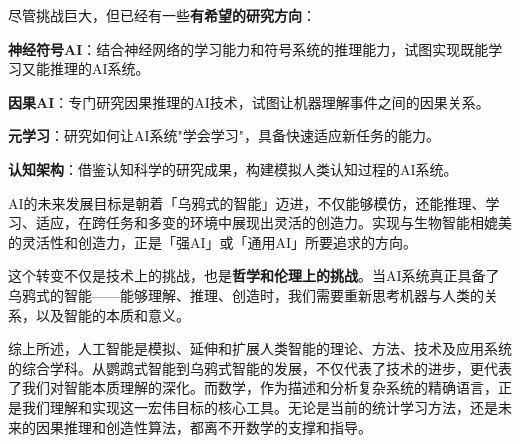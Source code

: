 尽管挑战巨大，但已经有一些{\bf 有希望的研究方向}：

{\bf 神经符号AI}：结合神经网络的学习能力和符号系统的推理能力，试图实现既能学习又能推理的AI系统。

{\bf 因果AI}：专门研究因果推理的AI技术，试图让机器理解事件之间的因果关系。

{\bf 元学习}：研究如何让AI系统"学会学习"，具备快速适应新任务的能力。

{\bf 认知架构}：借鉴认知科学的研究成果，构建模拟人类认知过程的AI系统。

AI的未来发展目标是朝着「乌鸦式的智能」迈进，不仅能够模仿，还能推理、学习、适应，在跨任务和多变的环境中展现出灵活的创造力。实现与生物智能相媲美的灵活性和创造力，正是「强AI」或「通用AI」所要追求的方向。

这个转变不仅是技术上的挑战，也是{\bf 哲学和伦理上的挑战}。当AI系统真正具备了乌鸦式的智能——能够理解、推理、创造时，我们需要重新思考机器与人类的关系，以及智能的本质和意义。

综上所述，人工智能是模拟、延伸和扩展人类智能的理论、方法、技术及应用系统的综合学科。从鹦鹉式智能到乌鸦式智能的发展，不仅代表了技术的进步，更代表了我们对智能本质理解的深化。而数学，作为描述和分析复杂系统的精确语言，正是我们理解和实现这一宏伟目标的核心工具。无论是当前的统计学习方法，还是未来的因果推理和创造性算法，都离不开数学的支撑和指导。

\nocite{*}
\newpage
